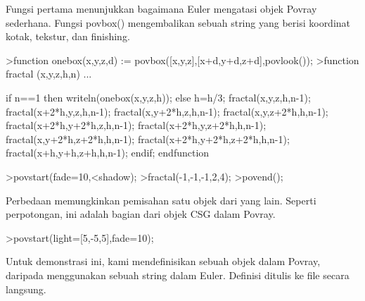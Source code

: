 \documentclass{article}
\begin{document}
\begin{eulernotebook}
\begin{eulercomment}
Fungsi pertama menunjukkan bagaimana Euler mengatasi objek Povray
sederhana. Fungsi povbox() mengembalikan sebuah string yang berisi
koordinat kotak, tekstur, dan finishing.
\end{eulercomment}
\begin{eulerprompt}
>function onebox(x,y,z,d) := povbox([x,y,z],[x+d,y+d,z+d],povlook());
>function fractal (x,y,z,h,n) ...
\end{eulerprompt}
\begin{eulerudf}
   if n==1 then writeln(onebox(x,y,z,h));
   else
     h=h/3;
     fractal(x,y,z,h,n-1);
     fractal(x+2*h,y,z,h,n-1);
     fractal(x,y+2*h,z,h,n-1);
     fractal(x,y,z+2*h,h,n-1);
     fractal(x+2*h,y+2*h,z,h,n-1);
     fractal(x+2*h,y,z+2*h,h,n-1);
     fractal(x,y+2*h,z+2*h,h,n-1);
     fractal(x+2*h,y+2*h,z+2*h,h,n-1);
     fractal(x+h,y+h,z+h,h,n-1);
   endif;
  endfunction
\end{eulerudf}
\begin{eulerprompt}
>povstart(fade=10,<shadow);
>fractal(-1,-1,-1,2,4);
>povend();
\end{eulerprompt}
\begin{eulercomment}
Perbedaan memungkinkan pemisahan satu objek dari yang lain. Seperti
perpotongan, ini adalah bagian dari objek CSG dalam Povray.
\end{eulercomment}
\begin{eulerprompt}
>povstart(light=[5,-5,5],fade=10);
\end{eulerprompt}
\begin{eulercomment}
Untuk demonstrasi ini, kami mendefinisikan sebuah objek dalam Povray,
daripada menggunakan sebuah string dalam Euler. Definisi ditulis ke
file secara langsung.


\end{eulercomment}
\end{eulernotebook}
\end{document}
